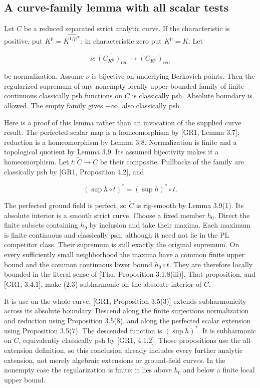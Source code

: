 \documentclass[11pt,a4paper]{article}
\begin{document}
\subsection*{A curve-family lemma with all scalar tests}

Let \(C\) be a reduced separated strict analytic curve. If the characteristic is positive, put \(K^{\mathrm p}=\widehat{K^{1/p^\infty}}\); in characteristic zero put \(K^{\mathrm p}=K\). Let

\[
\nu:\widetilde{(C_{K^{\mathrm p}})_{\mathrm{red}}}
\longrightarrow (C_{K^{\mathrm p}})_{\mathrm{red}}
\]

be normalization. Assume \(\nu\) is bijective on underlying Berkovich points. Then the regularized supremum of any nonempty locally upper-bounded family of finite continuous classically psh functions on \(C\) is classically psh. Absolute boundary is allowed. The empty family gives \(-\infty\), also classically psh.

Here is a proof of this lemma rather than an invocation of the supplied curve result. The perfected scalar map is a homeomorphism by [GR1, Lemma 3.7]; reduction is a homeomorphism by Lemma 3.8. Normalization is finite and a topological quotient by Lemma 3.9. Its assumed bijectivity makes it a homeomorphism. Let \(t:\widetilde C\to C\) be their composite. Pullbacks of the family are classically psh by [GR1, Proposition 4.2], and

\[
\left(\sup h\circ t\right)^*=(\sup h)^*\circ t. \tag{2.3}
\]

The perfected ground field is perfect, so \(\widetilde C\) is rig-smooth by Lemma 3.9(1). Its absolute interior is a smooth strict curve. Choose a fixed member \(h_0\). Direct the finite subsets containing \(h_0\) by inclusion and take their maxima. Each maximum is finite continuous and classically psh, although it need not lie in the PL competitor class. Their supremum is still exactly the original supremum. On every sufficiently small neighborhood the maxima have a common finite upper bound and the common continuous lower bound \(h_0\circ t\). They are therefore locally bounded in the literal sense of [Thu, Proposition 3.1.8(iii)]. That proposition, and [GR1, 3.4.1], make (2.3) subharmonic on the absolute interior of \(\widetilde C\).

It is usc on the whole curve. [GR1, Proposition 3.5(3)] extends subharmonicity across its absolute boundary. Descend along the finite surjections normalization and reduction using Proposition 3.5(8), and along the perfected scalar extension using Proposition 3.5(7). The descended function is \((\sup h)^*\). It is subharmonic on \(C\), equivalently classically psh by [GR1, 4.1.2]. Those propositions use the all-extension definition, so this conclusion already includes every further analytic extension, not merely algebraic extensions or ground-field curves. In the nonempty case the regularization is finite: it lies above \(h_0\) and below a finite local upper bound.
\end{document}
